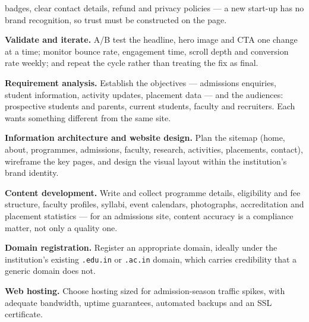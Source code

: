 \begin{qlist}
\begin{apts}
      badges, clear contact details, refund and privacy policies --- a new
      start-up has no brand recognition, so trust must be constructed on the
      page.
\item \textbf{Validate and iterate.} A/B test the headline, hero image and CTA
      one change at a time; monitor bounce rate, engagement time, scroll depth
      and conversion rate weekly; and repeat the cycle rather than treating the
      fix as final.
\end{apts}

\begin{apts}
\item \textbf{Requirement analysis.} Establish the objectives --- admissions
      enquiries, student information, activity updates, placement data --- and
      the audiences: prospective students and parents, current students, faculty
      and recruiters. Each wants something different from the same site.
\item \textbf{Information architecture and website design.} Plan the sitemap
      (home, about, programmes, admissions, faculty, research, activities,
      placements, contact), wireframe the key pages, and design the visual
      layout within the institution's brand identity.
\item \textbf{Content development.} Write and collect programme details,
      eligibility and fee structure, faculty profiles, syllabi, event
      calendars, photographs, accreditation and placement statistics --- for an
      admissions site, content accuracy is a compliance matter, not only a
      quality one.
\item \textbf{Domain registration.} Register an appropriate domain, ideally
      under the institution's existing \texttt{.edu.in} or \texttt{.ac.in}
      domain, which carries credibility that a generic domain does not.
\item \textbf{Web hosting.} Choose hosting sized for admission-season traffic
      spikes, with adequate bandwidth, uptime guarantees, automated backups and
      an SSL certificate.

\end{apts}
\end{qlist}
